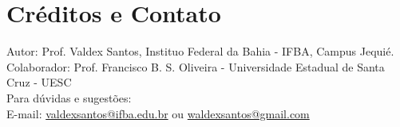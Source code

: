 \section{Créditos e Contato}\label{sec:contatos}
\noindent Autor: Prof. Valdex Santos, Instituo Federal da Bahia - IFBA, Campus Jequié.\\
Colaborador: Prof. Francisco B. S. Oliveira - Universidade Estadual de Santa Cruz - UESC\\
Para dúvidas e sugestões:\\
E-mail: \href{valdexsantos@ifba.edu.br}{valdexsantos@ifba.edu.br} ou \href{waldexsantos@gmail.com}{waldexsantos@gmail.com}\\

